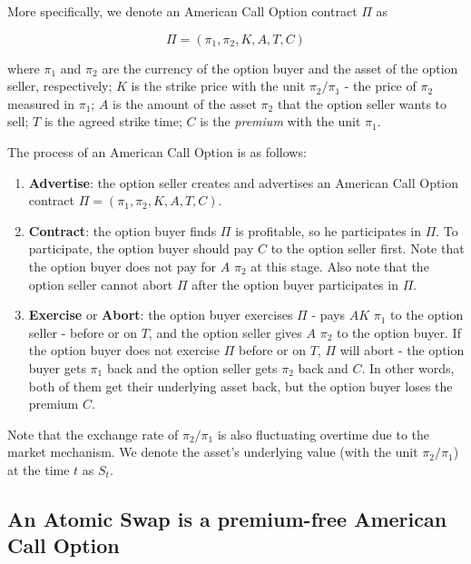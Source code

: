 More specifically, we denote an American Call Option contract $\Pi$ as

$$\Pi = (\pi_1, \pi_2, K, A, T, C)$$

where
$\pi_1$ and $\pi_2$ are the currency of the option buyer and the asset of the option seller, respectively; 
$K$ is the strike price with the unit $\pi_2 / \pi_1$ - the price of $\pi_2$ measured in $\pi_1$;
$A$ is the amount of the asset $\pi_2$ that the option seller wants to sell;
$T$ is the agreed strike time;
$C$ is the \textit{premium} with the unit $\pi_1$.

The process of an American Call Option is as follows:

\begin{enumerate}
    \item \textbf{Advertise}: the option seller creates and advertises an American Call Option contract $\Pi = (\pi_1, \pi_2, K, A, T, C)$.
    \item \textbf{Contract}: the option buyer finds $\Pi$ is profitable, so he participates in $\Pi$.
    To participate, the option buyer should pay $C$ to the option seller first.
    Note that the option buyer does not pay for $A$ $\pi_2$ at this stage.
    Also note that the option seller cannot abort $\Pi$ after the option buyer participates in $\Pi$.
    \item \textbf{Exercise} or \textbf{Abort}: the option buyer exercises $\Pi$ - pays $AK$ $\pi_1$ to the option seller - before or on $T$, and the option seller gives $A$ $\pi_2$ to the option buyer.
    If the option buyer does not exercise $\Pi$ before or on $T$, $\Pi$ will abort - the option buyer gets $\pi_1$ back and the option seller gets $\pi_2$ back and $C$. In other words, both of them get their underlying asset back, but the option buyer loses the premium $C$.
\end{enumerate}


Note that the exchange rate of $\pi_2 / \pi_1$ is also fluctuating overtime due to the market mechanism.
We denote the asset's underlying value (with the unit $\pi_2 / \pi_1$) at the time $t$ as $S_t$.












\subsection{An Atomic Swap is a premium-free American Call Option}

